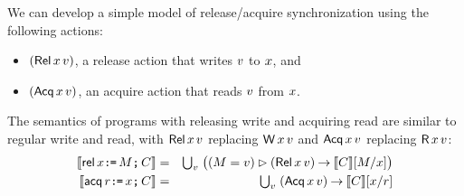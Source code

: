 

We can develop a simple model of release/acquire synchronization using the
following actions: %
\begin{itemize}
\item $(\DWRel{\aLoc}{\aVal})$, a release action that writes $v$ to $x$, and
\item $(\DRAcq{\aLoc}{\aVal})$, an acquire action that reads $v$ from $x$.
\end{itemize}
The semantics of programs with releasing write and acquiring read are similar
to regular write and read, with $\DWRel\aLoc\aVal$ replacing
$\DW\aLoc\aVal$ and $\DRAcq\aLoc\aVal$ replacing $\DR\aLoc\aVal$:
\begin{eqnarray*}
  \sem{\REL\aLoc\GETS\aExp\SEMI \aCmd} & = & \textstyle\bigcup_\aVal\; \bigl((\aExp=\aVal) \guard (\DWRel\aLoc\aVal) \prefix \sem{\aCmd}[\aExp/\aLoc]\bigr) \\
  \sem{\ACQ\aReg\GETS\aLoc\SEMI \aCmd} & = & \textstyle\bigcup_\aVal\; (\DRAcq\aLoc\aVal) \prefix \sem{\aCmd}[\aLoc/\aReg]
\end{eqnarray*}


